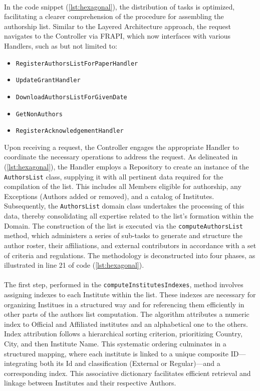 \paragraph{} In the code snippet (\ref{lst:hexagonal}), the distribution of tasks is optimized, facilitating a clearer comprehension of the procedure for assembling the authorship list. Similar to the Layered Architecture approach, the request navigates to the Controller via FRAPI, which now interfaces with various Handlers, such as but not limited to:
\begin{itemize}
    \item \verb|RegisterAuthorsListForPaperHandler|
    \item \verb|UpdateGrantHandler|
    \item \verb|DownloadAuthorsListForGivenDate|
    \item \verb|GetNonAuthors|
    \item \verb|RegisterAcknowledgementHandler|
\end{itemize}
\noindent
Upon receiving a request, the Controller engages the appropriate Handler to coordinate the necessary operations to address the request. As delineated in (\ref{lst:hexagonal}), the Handler employs a Repository to create an instance of the \texttt{AuthorsList} class, supplying it with all pertinent data required for the compilation of the list. This includes all Members eligible for authorship, any Exceptions (Authors added or removed), and a catalog of Institutes. Subsequently, the \texttt{AuthorsList} domain class undertakes the processing of this data, thereby consolidating all expertise related to the list's formation within the Domain. The construction of the list is executed via the \texttt{computeAuthorsList} method, which administers a series of sub-tasks to generate and structure the author roster, their affiliations, and external contributors in accordance with a set of criteria and regulations. The methodology is deconstructed into four phases, as illustrated in line 21 of code (\ref{lst:hexagonal}).

\paragraph{} The first step, performed in the \verb|computeInstitutesIndexes|, method involves assigning indexes to each Institute within the list. These indexes are necessary for organizing Institues in a structured way and for referencing them efficiently in other parts of the authors list computation. The algorithm attributes a numeric index to Official and Affiliated institutes and an alphabetical one to the others. Index attribution follows a hierarchical sorting criterion, prioritizing Country, City, and then Institute Name. This systematic ordering culminates in a structured mapping, where each institute is linked to a unique composite ID—integrating both its Id and classification (External or Regular)—and a corresponding index. This associative dictionary facilitates efficient retrieval and linkage between Institutes and their respective Authors.


